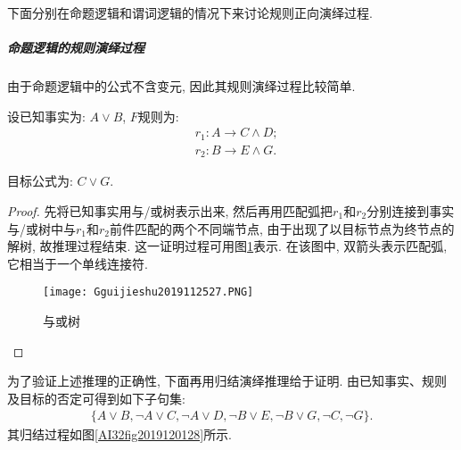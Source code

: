 下面分别在命题逻辑和谓词逻辑的情况下来讨论规则正向演绎过程.
\subparagraph{命题逻辑的规则演绎过程}
由于命题逻辑中的公式不含变元, 因此其规则演绎过程比较简单.
\begin{example}
    设已知事实为: $A\vee B$, $F$规则为:
\begin{align}
    &r_1:  A\rightarrow C\wedge D;\\
    &r_2:  B\rightarrow E\wedge G.
\end{align}

目标公式为: $C\vee G$.
\end{example}
\begin{proof}
先将已知事实用与/或树表示出来, 然后再用匹配弧把$r_1$和$r_2$分别连接到事实与/或树中与$r_1$和$r_2$前件匹配的两个不同端节点, 由于出现了以目标节点为终节点的解树, 故推理过程结束. 这一证明过程可用图\ref{AI32fig2019120127}表示.
在该图中, 双箭头表示匹配弧, 它相当于一个单线连接符.
\begin{figure}[H]
    \centering
    \texttt{[image: Gguijieshu2019112527.PNG]}
    \caption{与或树}
    \label{AI32fig2019120127}
\end{figure}
\end{proof}
为了验证上述推理的正确性, 下面再用归结演绎推理给于证明. 由已知事实、规则及目标的否定可得到如下子句集:
\begin{align}
    \{A\vee B, \neg A\vee C, \neg A\vee D, \neg B\vee E, \neg B\vee G, \neg C, \neg G\}.
\end{align}
其归结过程如图\ref{AI32fig2019120128}所示.
